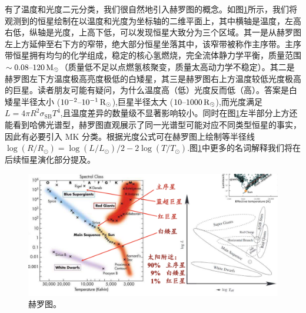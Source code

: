 \documentclass[../天体物理基础.tex]{subfiles}
\begin{document}
有了温度和光度二元分类，我们很自然地引入赫罗图的概念。如图\ref{赫罗图。}所示，我们将观测到的恒星绘制在以温度和光度为坐标轴的二维平面上，其中横轴是温度，左高右低，纵轴是光度，上高下低，可以发现恒星大致分为三个区域。其一是从赫罗图左上方延伸至右下方的窄带，绝大部分恒星坐落其中，该窄带被称作主序带。主序带恒星拥有均匀的化学组成，稳定的核心氢燃烧，完全流体静力学平衡，质量范围$\sim0.08\text{\textendash}120\,\unit{M_{\odot}}$（质量低不足以点燃氢核聚变，质量太高动力学不稳定）。其二是赫罗图左下方温度极高亮度极低的白矮星，其三是赫罗图右上方温度较低光度极高的巨星。读者朋友可能有疑问，为什么温度高（低）光度反而低（高）。答案是白矮星半径太小 ($10^{-2}\text{\textendash}10^{-1}\,\unit{R_{\odot}}$),巨星半径太大 ($10\text{\textendash}1000\,\unit{R_{\odot}}$),而光度满足$L=4\pi R^{2}\sigma_{\text{SB}}T^{4}$,且温度差异的数量级不显著影响较小。同时在图\ref{赫罗图。}左半部分上方还能看到哈佛光谱型，赫罗图直观展示了同一光谱型可能对应不同类型恒星的事实，因此有必要引入 MK 分类。根据光度公式可在赫罗图上绘制等半径线$\log\left(R/R_{\odot}\right)=\log\left(L/L_{\odot}\right)/2-2\log\left(T/T_{\odot}\right)$.图\ref{赫罗图。}中更多的名词解释我们将在后续恒星演化部分提及。

\begin{figure}[!htbp]
\centering
\includegraphics[width=14cm]{figures/figure1_14.png}
\captionsetup{justification=raggedright, singlelinecheck=false}
\caption{赫罗图。}
\label{赫罗图。}
\end{figure}
\end{document}
